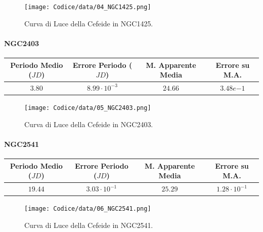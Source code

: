 \documentclass{article}
\newcommand{\e}[1]{\cdot 10^{#1}} %
\begin{document}
\begin{figure}[H]
  \centering
  \texttt{[image: Codice/data/04\_NGC1425.png]}
  \caption{Curva di Luce della Cefeide in NGC1425.}
\end{figure}

\paragraph{NGC2403}
\begin{center}
  \begin{tabular}{cccc}
  \toprule
  Periodo Medio ($JD$) & Errore Periodo ($JD$) & M. Apparente Media &
                                                                  Errore
                                                                      su
                                                                      M.A. \\
  \midrule
  $3.80$ & $8.99\e{-3}$ & $24.66$ & $3.48e{-1}$ \\
  \bottomrule
 \end{tabular}
\end{center}

\begin{figure}[H]
  \centering
  \texttt{[image: Codice/data/05\_NGC2403.png]}
  \caption{Curva di Luce della Cefeide in NGC2403.}
\end{figure}

\paragraph{NGC2541}
\begin{center}
  \begin{tabular}{cccc}
  \toprule
  Periodo Medio ($JD$) & Errore Periodo ($JD$) & M. Apparente Media &
                                                                  Errore
                                                                      su
                                                                      M.A. \\
  \midrule
  $19.44$ & $3.03\e{-1}$ & $25.29$ & $1.28\e{-1}$ \\
  \bottomrule
 \end{tabular}
\end{center}

\begin{figure}[H]
  \centering
  \texttt{[image: Codice/data/06\_NGC2541.png]}
  \caption{Curva di Luce della Cefeide in NGC2541.}
\end{figure}
\end{document}
